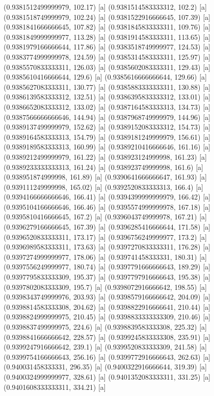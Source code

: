 {{{(0.9381512499999979, 102.17) [a] 
(0.9381514583333312, 102.2) [a] 
(0.9381518749999979, 102.24) [a] 
(0.9381522916666645, 107.39) [a] 
(0.9381841666666645, 107.82) [a] 
(0.9381845833333311, 109.76) [a] 
(0.9381849999999977, 113.28) [a] 
(0.9381914583333311, 113.65) [a] 
(0.9381979166666644, 117.86) [a] 
(0.9383518749999977, 124.53) [a] 
(0.9383774999999978, 124.59) [a] 
(0.9385314583333311, 125.97) [a] 
(0.9385570833333311, 126.03) [a] 
(0.9385602083333311, 129.43) [a] 
(0.9385610416666644, 129.6) [a] 
(0.9385616666666644, 129.66) [a] 
(0.9385627083333311, 130.77) [a] 
(0.9385883333333311, 130.88) [a] 
(0.9386139583333312, 132.51) [a] 
(0.9386395833333312, 133.01) [a] 
(0.9386652083333312, 133.02) [a] 
(0.9387164583333313, 134.73) [a] 
(0.9387566666666646, 144.94) [a] 
(0.9387968749999979, 144.96) [a] 
(0.9389137499999979, 152.62) [a] 
(0.9389152083333312, 154.73) [a] 
(0.9389164583333313, 154.79) [a] 
(0.9389181249999979, 156.61) [a] 
(0.9389189583333313, 160.99) [a] 
(0.9389210416666646, 161.16) [a] 
(0.9389212499999979, 161.22) [a] 
(0.938923124999998, 161.23) [a] 
(0.9389233333333313, 161.24) [a] 
(0.938923749999998, 161.6) [a] 
(0.938951874999998, 161.89) [a] 
(0.9390641666666647, 161.93) [a] 
(0.939111249999998, 165.02) [a] 
(0.9392520833333313, 166.4) [a] 
(0.9394166666666646, 166.41) [a] 
(0.9394399999999979, 166.42) [a] 
(0.9395104166666646, 166.46) [a] 
(0.9395574999999978, 167.18) [a] 
(0.9395810416666645, 167.2) [a] 
(0.9396043749999978, 167.21) [a] 
(0.9396279166666645, 167.39) [a] 
(0.9396285416666644, 171.58) [a] 
(0.9396520833333311, 173.17) [a] 
(0.9396756249999977, 173.2) [a] 
(0.9396989583333311, 173.63) [a] 
(0.9397270833333311, 176.28) [a] 
(0.9397274999999977, 178.06) [a] 
(0.939741458333331, 180.31) [a] 
(0.9397556249999977, 180.74) [a] 
(0.9397791666666643, 189.29) [a] 
(0.9397795833333309, 195.37) [a] 
(0.9397797916666643, 195.38) [a] 
(0.9397802083333309, 195.7) [a] 
(0.9398072916666642, 198.55) [a] 
(0.9398343749999976, 203.93) [a] 
(0.9398579166666642, 204.09) [a] 
(0.9398814583333308, 204.62) [a] 
(0.9398822916666641, 210.44) [a] 
(0.9398824999999975, 210.45) [a] 
(0.9398833333333309, 210.46) [a] 
(0.9398837499999975, 224.6) [a] 
(0.9398839583333308, 225.32) [a] 
(0.9398841666666642, 228.57) [a] 
(0.9399245833333308, 235.91) [a] 
(0.9399247916666642, 239.1) [a] 
(0.9399520833333309, 241.58) [a] 
(0.9399754166666643, 256.16) [a] 
(0.9399772916666643, 262.63) [a] 
(0.940031458333331, 296.35) [a] 
(0.9400322916666644, 319.39) [a] 
(0.9400324999999977, 328.61) [a] 
(0.9401352083333311, 331.25) [a] 
(0.9401608333333311, 334.21) [a] 
}}}
